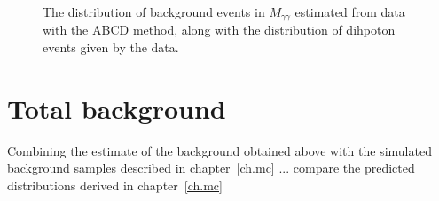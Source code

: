 \begin{figure}[htp]
\begin{minipage}[b]{.69\textwidth}
\begin{infilsf} \tiny 

\end{infilsf}
\end{minipage}\hfill\begin{minipage}[b]{.3\textwidth}
\caption{The distribution of background events in $M_{\gamma\gamma}$ estimated from data with the ABCD method, along with the distribution of dihpoton events given by the data.
\label{mggbck}}
\end{minipage}
\end{figure}

\section{Total background}
Combining the estimate of the background obtained above with the simulated background samples described in chapter~\ref{ch.mc} ... compare the predicted distributions derived in chapter~\ref{ch.mc}